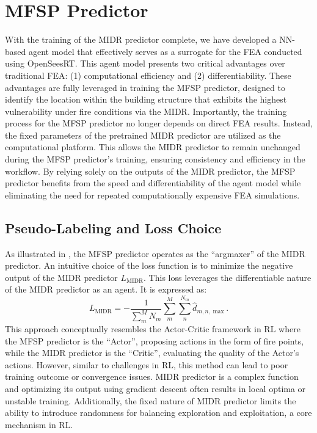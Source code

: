 \section{MFSP Predictor}
\label{sec:mfspp}

With the training of the MIDR predictor complete, we have developed a NN-based agent model that effectively serves as a surrogate for the FEA conducted using OpenSeesRT. This agent model presents two critical advantages over traditional FEA: (1) computational efficiency and (2) differentiability. These advantages are fully leveraged in training the MFSP predictor, designed to identify the location within the building structure that exhibits the highest vulnerability under fire conditions via the MIDR. Importantly, the training process for the MFSP predictor no longer depends on direct FEA results. Instead, the fixed parameters of the pretrained MIDR predictor are utilized as the computational platform. This allows the MIDR predictor to remain unchanged during the MFSP predictor's training, ensuring consistency and efficiency in the workflow. By relying solely on the outputs of the MIDR predictor, the MFSP predictor benefits from the speed and differentiability of the agent model while eliminating the need for repeated computationally expensive FEA simulations.

\subsection{Pseudo-Labeling and Loss Choice}
\label{subsec:mfspp_pseudo_label}
As illustrated in , the MFSP predictor operates as the ``argmaxer'' of the MIDR predictor. An intuitive choice of the loss function is to minimize the negative output of the MIDR predictor $L_{\text{MIDR}}$. This loss leverages the differentiable nature of the MIDR predictor as an agent. It is expressed as:  
\begin{equation}
    L_{\text{MIDR}} = - \frac{1}{\sum_{m}^{M}N_{m}}\sum_{m}^{M}\sum_{n}^{N_m} \widehat{d}_{m,n,\max}.
\end{equation}
This approach conceptually resembles the Actor-Critic framework in RL \cite{sutton2018reinforcement} where the MFSP predictor is the ``Actor'', proposing actions in the form of fire points, while the MIDR predictor is the ``Critic'', evaluating the quality of the Actor's actions. However, similar to challenges in RL, this method can lead to poor training outcome or convergence issues. MIDR predictor is a complex function and optimizing its output using gradient descent often results in local optima or unstable training. Additionally, the fixed nature of MIDR predictor limits the ability to introduce randomness for balancing exploration and exploitation, a core mechanism in RL.

